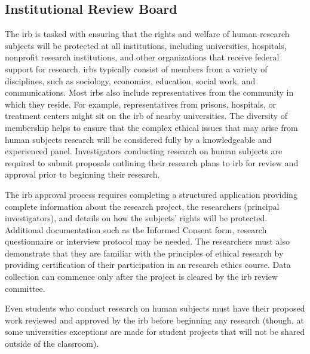 \subsection{Institutional Review Board}

The \gls{irb} is tasked with ensuring that the rights and welfare of human research subjects will be protected at all institutions, including universities, hospitals, nonprofit research institutions, and other organizations that receive federal support for research. \glspl{irb} typically consist of members from a variety of disciplines, such as sociology, economics, education, social work, and communications. Most \glspl{irb} also include representatives from the community in which they reside. For example, representatives from prisons, hospitals, or treatment centers might sit on the \gls{irb} of nearby universities. The diversity of membership helps to ensure that the complex ethical issues that may arise from human subjects research will be considered fully by a knowledgeable and experienced panel. Investigators conducting research on human subjects are required to submit proposals outlining their research plans to \gls{irb} for review and approval prior to beginning their research. 

The \gls{irb} approval process requires completing a structured application providing complete information about the research project, the researchers (principal investigators), and details on how the subjects' rights will be protected. Additional documentation such as the Informed Consent form, research questionnaire or interview protocol may be needed. The researchers must also demonstrate that they are familiar with the principles of ethical research by providing certification of their participation in an research ethics course. Data collection can commence only after the project is cleared by the \gls{irb} review committee.

Even students who conduct research on human subjects must have their proposed work reviewed and approved by the \gls{irb} before beginning any research (though, at some universities exceptions are made for student projects that will not be shared outside of the classroom).

